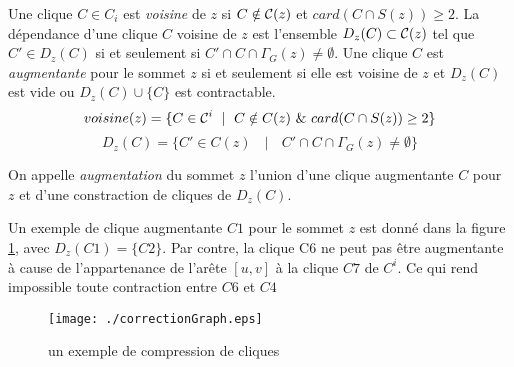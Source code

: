 \begin{definition}
Une clique $C \in C_i$ est {\em voisine} de $z$ si $C \notin {\cal C}(z)$ et $card(C \cap S(z)) \ge 2$.
La d\'ependance d'une clique $C$ voisine de $z$ est l'ensemble $D_z(C) \subset {\cal C}(z)$ tel que $C' \in D_z(C)$ si et seulement si  $C' \cap C \cap \Gamma_{G}(z) \ne \emptyset$.
\newline
Une clique $C$ est {\em augmentante} pour le sommet $z$ si et seulement si elle est voisine de $z$ et  $D_z(C)$ est vide  ou $D_{z}(C) \cup \{C\}$ est contractable.
\begin{equation}
voisine(z) = \{C \in {\cal C}^i \mbox{ } \mid \mbox{ } C \notin C(z) \mbox{ } \& \mbox{ } card(C \cap S(z)) \ge 2 \} \newline
\end{equation}
\begin{equation}
D_{z}(C) = \{ C' \in C(z) \mbox{ } \mid  \mbox{ } C' \cap C \cap \Gamma_{G}(z) \ne \emptyset \}
\end{equation}
\end{definition}

On appelle {\em  augmentation} du sommet $z$ l'union d'une clique augmentante  $C$ pour $z$ et d'une constraction de cliques de $D_z(C)$.

Un exemple de clique augmentante $C1$ pour le sommet $z$ est donn\'e dans la figure \ref{exempleAlgoCorrectionGraphe}, avec $D_z(C1) = \{C2\}$.
Par contre, la clique C6 ne peut pas \^etre augmentante \`a cause de l'appartenance de l'ar\^ete $[u,v]$ \`a la clique $C7$ de $C^i$. Ce qui rend impossible toute contraction entre $C6$ et $C4$
\begin{centering} 
\begin{figure}[htb!]
\texttt{[image: ./correctionGraph.eps]} \vspace{-0.5em}
\caption{un exemple de compression de cliques}
\label{exempleAlgoCorrectionGraphe}
\end{figure}
\end{centering} 

